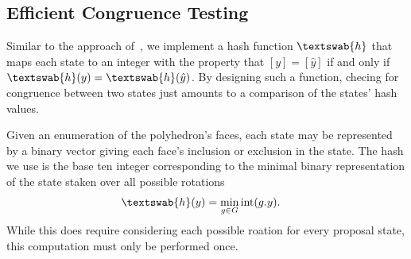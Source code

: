 \subsection{Efficient Congruence Testing}

Similar to the approach of~\cite{Pandey2011}, we implement a hash function $\textswab{h}$ that maps each state to an integer with the property that $[y] = [\hat{y}]$ if and only if $\textswab{h}(y) = \textswab{h}(\hat{y})$. By designing such a function, checing for congruence between two states just amounts to a comparison of the states' hash values. 

Given an enumeration of the polyhedron's faces, each state may be represented by a binary vector giving each face's inclusion or exclusion in the state. The hash we use is the base ten integer corresponding to the minimal binary representation of the state staken over all possible rotations
\begin{align}
\textswab{h}(y) &= \min_{g \in G} \text{int}(g.y).
\end{align} 
While this does require considering each possible roation for every proposal state, this computation must only be performed once. 





